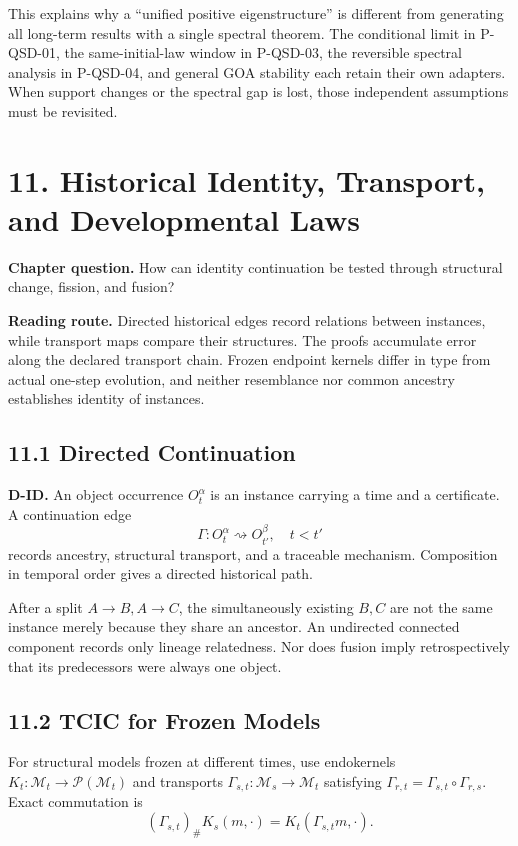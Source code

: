 \documentclass[
  english,
  11pt,
  oneside]{book}
\begin{document}
This explains why a ``unified positive eigenstructure'' is different from generating all long-term results with a single spectral theorem. The conditional limit in P-QSD-01, the same-initial-law window in P-QSD-03, the reversible spectral analysis in P-QSD-04, and general GOA stability each retain their own adapters. When support changes or the spectral gap is lost, those independent assumptions must be revisited.

\chapter{11. Historical Identity, Transport, and Developmental Laws}\label{ch-11}

\textbf{Chapter question.} How can identity continuation be tested through structural change, fission, and fusion?

\textbf{Reading route.} Directed historical edges record relations between instances, while transport maps compare their structures. The proofs accumulate error along the declared transport chain. Frozen endpoint kernels differ in type from actual one-step evolution, and neither resemblance nor common ancestry establishes identity of instances.

\section{11.1 Directed Continuation}\label{directed-continuation}

\textbf{D-ID.} An object occurrence \(O_t^\alpha\) is an instance carrying a time and a certificate. A continuation edge \[\Gamma:O_t^\alpha\rightsquigarrow O_{t'}^\beta,\quad t<t'\] records ancestry, structural transport, and a traceable mechanism. Composition in temporal order gives a directed historical path.

After a split \(A\to B,A\to C\), the simultaneously existing \(B,C\) are not the same instance merely because they share an ancestor. An undirected connected component records only lineage relatedness. Nor does fusion imply retrospectively that its predecessors were always one object.

\section{11.2 TCIC for Frozen Models}\label{tcic-for-frozen-models}

For structural models frozen at different times, use endokernels \(K_t:\mathcal M_t\to\mathcal P(\mathcal M_t)\) and transports \(\Gamma_{s,t}:\mathcal M_s\to\mathcal M_t\) satisfying \(\Gamma_{r,t}=\Gamma_{s,t}\circ\Gamma_{r,s}\). Exact commutation is \[(\Gamma_{s,t})_\#K_s(m,\cdot)=K_t(\Gamma_{s,t}m,\cdot).\]
\end{document}
